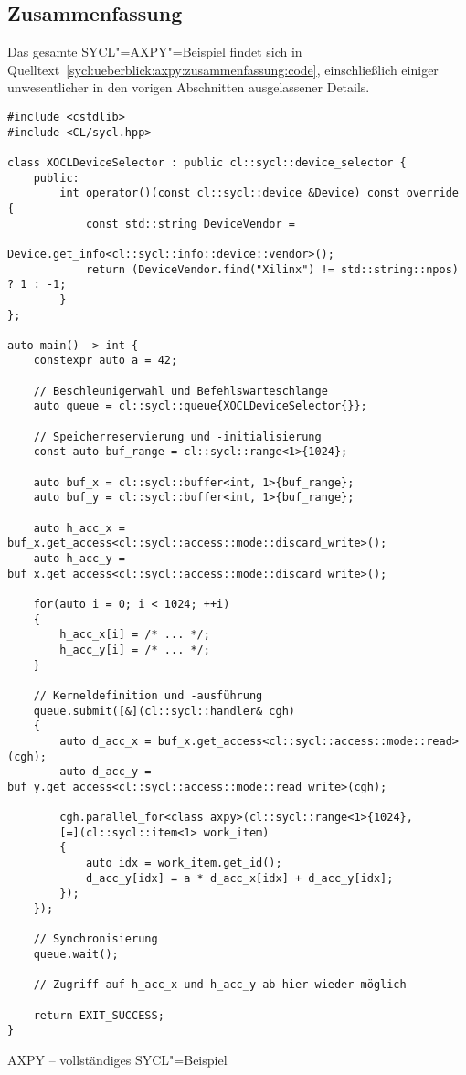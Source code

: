 \subsection{Zusammenfassung}
\label{sycl:ueberblick:axpy:zusammenfassung}

Das gesamte SYCL"=AXPY"=Beispiel findet sich in
Quelltext~\ref{sycl:ueberblick:axpy:zusammenfassung:code}, einschließlich
einiger unwesentlicher in den vorigen Abschnitten ausgelassener Details.

\begin{code}
    \begin{verbatim}
#include <cstdlib>
#include <CL/sycl.hpp>

class XOCLDeviceSelector : public cl::sycl::device_selector {
    public:
        int operator()(const cl::sycl::device &Device) const override {
            const std::string DeviceVendor =
                            Device.get_info<cl::sycl::info::device::vendor>();
            return (DeviceVendor.find("Xilinx") != std::string::npos) ? 1 : -1;
        }
};

auto main() -> int {
    constexpr auto a = 42;

    // Beschleunigerwahl und Befehlswarteschlange
    auto queue = cl::sycl::queue{XOCLDeviceSelector{}};

    // Speicherreservierung und -initialisierung
    const auto buf_range = cl::sycl::range<1>{1024};

    auto buf_x = cl::sycl::buffer<int, 1>{buf_range};
    auto buf_y = cl::sycl::buffer<int, 1>{buf_range};

    auto h_acc_x = buf_x.get_access<cl::sycl::access::mode::discard_write>();
    auto h_acc_y = buf_x.get_access<cl::sycl::access::mode::discard_write>();

    for(auto i = 0; i < 1024; ++i)
    {
        h_acc_x[i] = /* ... */;
        h_acc_y[i] = /* ... */;
    }

    // Kerneldefinition und -ausführung
    queue.submit([&](cl::sycl::handler& cgh)
    {
        auto d_acc_x = buf_x.get_access<cl::sycl::access::mode::read>(cgh);
        auto d_acc_y = buf_y.get_access<cl::sycl::access::mode::read_write>(cgh);

        cgh.parallel_for<class axpy>(cl::sycl::range<1>{1024},
        [=](cl::sycl::item<1> work_item)
        {
            auto idx = work_item.get_id();
            d_acc_y[idx] = a * d_acc_x[idx] + d_acc_y[idx];
        });
    });

    // Synchronisierung
    queue.wait();

    // Zugriff auf h_acc_x und h_acc_y ab hier wieder möglich

    return EXIT_SUCCESS;
}
    \end{verbatim}
    \caption{AXPY -- vollständiges SYCL"=Beispiel}
    \label{sycl:ueberblick:axpy:zusammenfassung:code}
\end{code}

